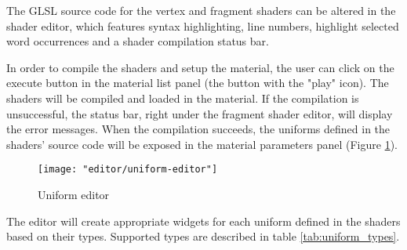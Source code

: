 The GLSL source code for the vertex and fragment shaders can be altered in the shader editor, which features syntax highlighting, line numbers, highlight selected word occurrences and a shader compilation status bar.

In order to compile the shaders and setup the material, the user can click on the execute button in the material list panel (the button with the "play" icon). The shaders will be compiled and loaded in the material. If the compilation is unsuccessful, the status bar, right under the fragment shader editor, will display the error messages. When the compilation succeeds, the uniforms defined in the shaders' source code will be exposed in the material parameters panel (Figure \ref{fig:uniform-editor}).

\begin{figure}
    \caption{Uniform editor}
    \begin{center}
        \texttt{[image: "editor/uniform-editor"]}
    \end{center}
    \label{fig:uniform-editor}
\end{figure}

The editor will create appropriate widgets for each uniform defined in the shaders based on their types. Supported types are described in table \ref{tab:uniform_types}.

